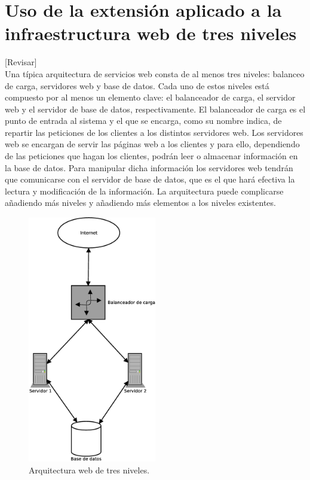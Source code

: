 \chapter{Uso de la extensión aplicado a la infraestructura web de tres niveles}
\label{cap:web}

[Revisar]\\

Una típica arquitectura de servicios web consta de al menos tres niveles: balanceo de carga, servidores web y base de datos. Cada uno de estos niveles está compuesto por al menos un elemento clave: el balanceador de carga, el servidor web y el servidor de base de datos, respectivamente. El balanceador de carga es el punto de entrada al sistema y el que se encarga, como su nombre indica, de repartir las peticiones de los clientes a los distintos servidores web. Los servidores web se encargan de servir las páginas web a los clientes y para ello, dependiendo de las peticiones que hagan los clientes, podrán leer o almacenar información en la base de datos. Para manipular dicha información los servidores web tendrán que comunicarse con el servidor de base de datos, que es el que hará efectiva la lectura y modificación de la información. La arquitectura puede complicarse añadiendo más niveles y añadiendo más elementos a los niveles existentes.\\

\begin{figure} [!htbp]
  \centering
  \includegraphics[width=0.5\textwidth]{figuras/Arquitectura_web2.eps}
  \caption{Arquitectura web de tres niveles.}
\label{figure:arquitectura-web}
\end{figure}

